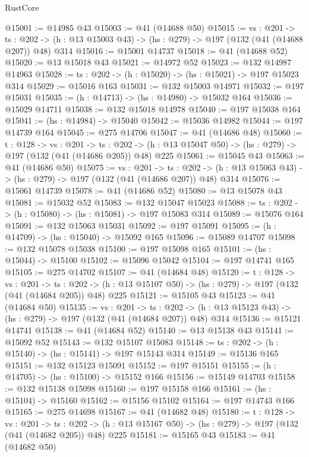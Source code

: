 \begin{lexlean}{RustCore}
\begin{coremodule}
@15001 := @14985 @43
@15003 := @41 (@14688 @50)
@15015 := {vs : @201} ->
  {ts : @202} -> (h : @13 @15003 @43) -> (hs : @279) -> @197 (@132 (@41 (@14688 @207)) @48) @314
@15016 := @15001 @14737
@15018 := @41 (@14688 @52)
@15020 := @13 @15018 @43
@15021 := @14972 @52
@15023 := @132 @14987 @14963
@15028 := {ts : @202} -> (h : @15020) -> (hs : @15021) -> @197 @15023 @314
@15029 := @15016 @163
@15031 := @132 @15003 @14971
@15032 := @197 @15031
@15035 := (h : @14713) -> (hs : @14980) -> @15032 @164
@15036 := @15029 @14711
@15038 := @132 @15018 @14978
@15040 := @197 @15038 @164
@15041 := (hs : @14984) -> @15040
@15042 := @15036 @14982
@15044 := @197 @14739 @164
@15045 := @275 @14706
@15047 := @41 (@14686 @48)
@15060 := {t : @128} ->
  {vs : @201} ->
  {ts : @202} -> (h : @13 @15047 @50) -> (hs : @279) -> @197 (@132 (@41 (@14686 @205)) @48) @225
@15061 := @15045 @43
@15063 := @41 (@14686 @50)
@15075 := {vs : @201} ->
  {ts : @202} -> (h : @13 @15063 @43) -> (hs : @279) -> @197 (@132 (@41 (@14686 @207)) @48) @314
@15076 := @15061 @14739
@15078 := @41 (@14686 @52)
@15080 := @13 @15078 @43
@15081 := @15032 @52
@15083 := @132 @15047 @15023
@15088 := {ts : @202} -> (h : @15080) -> (hs : @15081) -> @197 @15083 @314
@15089 := @15076 @164
@15091 := @132 @15063 @15031
@15092 := @197 @15091
@15095 := (h : @14709) -> (hs : @15040) -> @15092 @165
@15096 := @15089 @14707
@15098 := @132 @15078 @15038
@15100 := @197 @15098 @165
@15101 := (hs : @15044) -> @15100
@15102 := @15096 @15042
@15104 := @197 @14741 @165
@15105 := @275 @14702
@15107 := @41 (@14684 @48)
@15120 := {t : @128} ->
  {vs : @201} ->
  {ts : @202} -> (h : @13 @15107 @50) -> (hs : @279) -> @197 (@132 (@41 (@14684 @205)) @48) @225
@15121 := @15105 @43
@15123 := @41 (@14684 @50)
@15135 := {vs : @201} ->
  {ts : @202} -> (h : @13 @15123 @43) -> (hs : @279) -> @197 (@132 (@41 (@14684 @207)) @48) @314
@15136 := @15121 @14741
@15138 := @41 (@14684 @52)
@15140 := @13 @15138 @43
@15141 := @15092 @52
@15143 := @132 @15107 @15083
@15148 := {ts : @202} -> (h : @15140) -> (hs : @15141) -> @197 @15143 @314
@15149 := @15136 @165
@15151 := @132 @15123 @15091
@15152 := @197 @15151
@15155 := (h : @14705) -> (hs : @15100) -> @15152 @166
@15156 := @15149 @14703
@15158 := @132 @15138 @15098
@15160 := @197 @15158 @166
@15161 := (hs : @15104) -> @15160
@15162 := @15156 @15102
@15164 := @197 @14743 @166
@15165 := @275 @14698
@15167 := @41 (@14682 @48)
@15180 := {t : @128} ->
  {vs : @201} ->
  {ts : @202} -> (h : @13 @15167 @50) -> (hs : @279) -> @197 (@132 (@41 (@14682 @205)) @48) @225
@15181 := @15165 @43
@15183 := @41 (@14682 @50)

\end{coremodule}
\end{lexlean}
